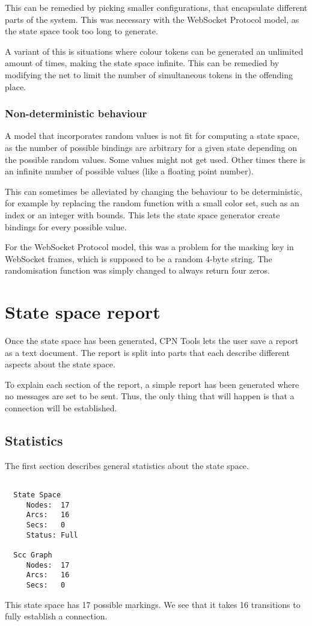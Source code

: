 		This can be remedied by picking smaller configurations,  that encapsulate
		different parts of the system. This was necessary with the WebSocket Protocol
		model, as the state space took too long to generate.
		
		A variant of this is situations where colour tokens can be generated an
		unlimited amount of times, making the state space infinite. This can be
		remedied by modifying the net to limit the number of simultaneous tokens in
		the offending place.
		 
		\subsubsection{Non-deterministic behaviour}
		A model that incorporates random values is not fit for computing a state
		space, as the number of possible bindings are arbitrary for a given state
		depending on the possible random values. Some values might not get used. Other
		times there is an infinite number of possible values (like a floating point
		number).
		
		This can sometimes be alleviated by changing the behaviour to be
		deterministic, for example by replacing the random function with a small color
		set, such as an index or an integer with bounds. This lets the state space
		generator create bindings for every possible value. 
		
		For the WebSocket Protocol model, this was a problem for the masking key in
		WebSocket frames, which is supposed to be a random 4-byte string. The
		randomisation function was simply changed to always return four zeros.

\section{State space report}
Once the state space has been generated, CPN Tools lets the user save a report
as a text document. The report is split into parts that each describe different
aspects about the state space.

To explain each section of the report, a simple report has been generated where
no messages are set to be sent. Thus, the only thing that will happen is that a
connection will be established.
	
	\subsection{Statistics}
	The first section describes general statistics about the state space.
	\begin{lstlisting}[language={}]

  State Space
     Nodes:  17
     Arcs:   16
     Secs:   0
     Status: Full

  Scc Graph
     Nodes:  17
     Arcs:   16
     Secs:   0

	\end{lstlisting}
	This state space has 17 possible markings. We see that it takes 16 transitions
	to fully establish a connection.
	
